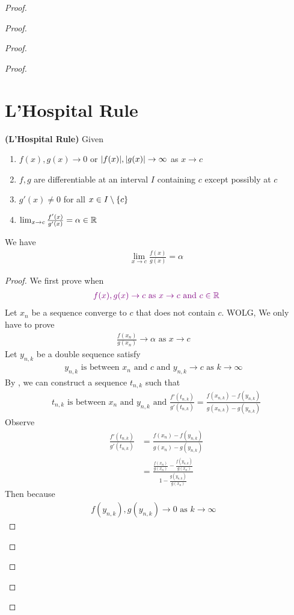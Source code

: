 \documentclass{report}
\begin{document}
\begin{proof}
\begin{proof}
\begin{proof}
\begin{proof}
\section{L'Hospital Rule}
\begin{theorem}
\label{6.4.1}
\textbf{(L'Hospital Rule)} Given 
\begin{enumerate}[label=(\alph*)]
  \item $f(x),g(x) \to 0$ or $|f(x)|,|g(x)|\to \infty$ as $x \to c$
  \item $f,g$ are differentiable at an interval  $I$ containing  $c$  except possibly at $c$ 
  \item $g'(x)\neq 0$ for all $x\in I \setminus \{ c \}$ 
  \item $\lim_{x \to c}\frac{f'(x)}{g'(x)}=\alpha \in\mathbb{R}$
\end{enumerate}
We have 
\begin{align*}
\lim_{x \to c} \frac{f(x)}{g(x)}=\alpha 
\end{align*}
\end{theorem}
\begin{proof}
We first prove when 
 \begin{align*}
 \textcolor{violet}{f(x),g(x)\to c\text{ as $x \to c$ and $c\in\mathbb{R}$} }
 \end{align*}
Let $x_n$ be a sequence converge to $c$ that does not contain $c$. WOLG, We only have to prove 
\begin{align*}
\frac{f(x_n)}{g(x_n)}\to \alpha \text{ as $x \to c$ }
\end{align*}
Let $y_{n,k}$ be a double sequence satisfy 
\begin{align*}
y_{n,k} \text{ is between }x_n\text{ and }c\text{ and }y_{n,k}\to c\text{ as $k\to \infty$ }
\end{align*}
By , we can construct a sequence $t_{n,k}$ such that 
 \begin{align*}
t_{n,k} \text{ is between $x_n$ and  $y_{n,k}$ and }\frac{f'(t_{n,k})}{g'(t_{n,k})}=\frac{f(x_{n,k})-f(y_{n,k})}{g(x_{n,k})-g(y_{n,k})}
\end{align*}
Observe 
\begin{align*}
\frac{f'(t_{n,k})}{g'(t_{n,k})}&=\frac{f(x_{n})-f(y_{n,k})}{g(x_n)-g(y_{n,k})}\\
&=\frac{\frac{f(x_n)}{g(x_n)}-\frac{f(y_{n,k})}{g(x_n)}}{1-\frac{g(y_{n,k})}{g(x_n)}}
\end{align*}
Then because 
\begin{align*}
f(y_{n,k}),g(y_{n,k})\to 0\text{ as $k \to \infty$ }
\end{align*}

\end{proof}
\end{proof}
\end{proof}
\end{proof}
\end{proof}
\end{document}
